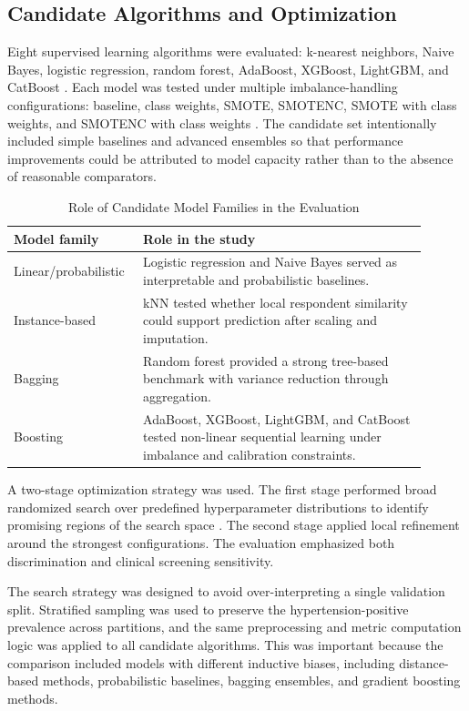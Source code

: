\documentclass[journal]{IEEEtran}
\begin{document}
\subsection{Candidate Algorithms and Optimization}
Eight supervised learning algorithms were evaluated: k-nearest neighbors, Naive Bayes, logistic regression, random forest, AdaBoost, XGBoost, LightGBM, and CatBoost \cite{xgboost,lightgbm,catboost}. Each model was tested under multiple imbalance-handling configurations: baseline, class weights, SMOTE, SMOTENC, SMOTE with class weights, and SMOTENC with class weights \cite{chawla2002smote}. The candidate set intentionally included simple baselines and advanced ensembles so that performance improvements could be attributed to model capacity rather than to the absence of reasonable comparators.

\begin{table}[!t]
\caption{Role of Candidate Model Families in the Evaluation}
\label{tab:modelfamilies}
\centering
\footnotesize
\begin{tabular}{p{0.25\linewidth}p{0.65\linewidth}}
\toprule
Model family & Role in the study\\
\midrule
Linear/probabilistic & Logistic regression and Naive Bayes served as interpretable and probabilistic baselines.\\
Instance-based & kNN tested whether local respondent similarity could support prediction after scaling and imputation.\\
Bagging & Random forest provided a strong tree-based benchmark with variance reduction through aggregation.\\
Boosting & AdaBoost, XGBoost, LightGBM, and CatBoost tested non-linear sequential learning under imbalance and calibration constraints.\\
\bottomrule
\end{tabular}
\end{table}

A two-stage optimization strategy was used. The first stage performed broad randomized search over predefined hyperparameter distributions to identify promising regions of the search space \cite{bergstra2012random}. The second stage applied local refinement around the strongest configurations. The evaluation emphasized both discrimination and clinical screening sensitivity.

The search strategy was designed to avoid over-interpreting a single validation split. Stratified sampling was used to preserve the hypertension-positive prevalence across partitions, and the same preprocessing and metric computation logic was applied to all candidate algorithms. This was important because the comparison included models with different inductive biases, including distance-based methods, probabilistic baselines, bagging ensembles, and gradient boosting methods.
\end{document}
